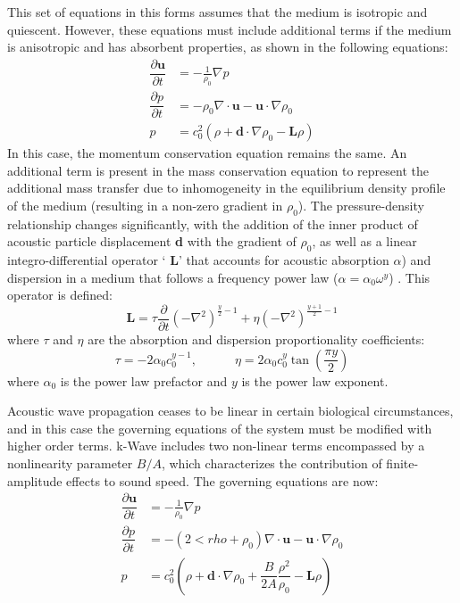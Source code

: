 \documentclass[10pt,a4paper]{article}
\begin{document}
This set of equations in this forms assumes that the medium is isotropic and quiescent. However, these equations must include additional terms if the medium is anisotropic and has absorbent properties, as shown in the following equations:
\begin{align}
\dfrac{\partial \textbf{u}}{\partial t} &= - \frac{1}{\rho_0} \nabla p\\
\dfrac{\partial p }{\partial t} &= - \rho_0 \nabla \cdot \textbf{u} - \textbf{u}\cdot \nabla \rho_0 \\
p &= c_0^2 (\rho + \textbf{d}\cdot\nabla \rho_0 -\textbf{L}\rho)
\end{align}
In this case, the momentum conservation equation remains the same. An additional term is present in the mass conservation equation to represent the additional mass transfer due to inhomogeneity in the equilibrium density profile of the medium (resulting in a non-zero gradient in $\rho_0$). The pressure-density relationship changes significantly, with the addition of the inner product of acoustic particle displacement \textbf{d} with the gradient of $\rho_0$, as well as a linear integro-differential operator ` \textbf{L}' that accounts for acoustic absorption $\alpha$) and dispersion in a medium that follows a frequency power law ($\alpha = \alpha_0 \omega^y$)  . This operator is defined:
\begin{equation}\label{Powerlawabsorption}
\textbf{L} = \tau \frac{\partial}{\partial t} ( - \nabla^2)^{\frac{y}{2} - 1} + \eta (-\nabla^2)^{\frac{y+1}{2} -1}
\end{equation}
where $\tau$ and $\eta$ are the absorption and dispersion proportionality coefficients:
\begin{equation}
\tau = -2\alpha_0c_0^{y-1}, \quad \quad \quad \eta = 2 \alpha_0c_0^y \tan \left(\frac{\pi y}{2} \right)
\end{equation}
where $\alpha_0$ is the power law prefactor and $y$ is the power law exponent. 

Acoustic wave propagation ceases to be linear in certain biological circumstances, and in this case the governing equations of the system must be modified with higher order terms. k-Wave includes two non-linear terms   encompassed by a nonlinearity parameter $B/A$, which characterizes the contribution of finite-amplitude effects to sound speed. The governing equations are now:
\begin{align}
\dfrac{\partial \textbf{u}}{\partial t} &= - \frac{1}{\rho_0} \nabla p\\
\dfrac{\partial p }{\partial t} &= - (2<rho+\rho_0) \nabla \cdot \textbf{u} - \textbf{u}\cdot \nabla \rho_0 \\
p &= c_0^2 \left(\rho + \textbf{d}\cdot\nabla \rho_0 + \dfrac{B}{2A} \dfrac{\rho^2}{\rho_0}-\textbf{L}\rho\right)
\end{align}
\end{document}
